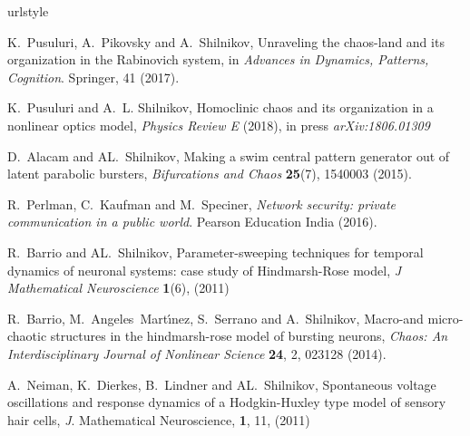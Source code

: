 \documentclass{ws-book9x6}
\begin{document}
%

%

% 

\begin{thebibliography}{6}
\newcommand{\enquote}[1]{#1}
\providecommand{\natexlab}[1]{#1}
\providecommand{\url}[1]{\texttt{#1}}
\providecommand{\urlprefix}{URL }
\providecommand{\eprint}{eprint }
\expandafter\ifx\csname urlstyle\endcsname\relax
  \providecommand{\doi}[1]{doi:\discretionary{}{}{}#1}\else
  \providecommand{\doi}{doi:\discretionary{}{}{}\begingroup
  \urlstyle{rm}\Url}\fi


K.~Pusuluri, A.~Pikovsky and A.~Shilnikov, \enquote{Unraveling the chaos-land
  and its organization in the Rabinovich system,} in \emph{Advances in
  Dynamics, Patterns, Cognition}.
\newblock Springer, 41 (2017).

K.~Pusuluri and A.~L. Shilnikov, \enquote{Homoclinic chaos and its organization
  in a nonlinear optics model,}  \emph{Physics Review E} (2018), in press  \emph{arXiv:1806.01309}  

D.~Alacam and AL.~Shilnikov,  \enquote{Making a swim central pattern generator out of latent parabolic bursters,} \emph{Bifurcations and Chaos} \textbf{25}(7), 1540003 (2015).

R.~Perlman, C.~Kaufman and M.~Speciner, \emph{Network security: private
  communication in a public world}.
\newblock Pearson Education India (2016).

R.~Barrio and AL.~Shilnikov, \enquote{Parameter-sweeping techniques for temporal dynamics of neuronal systems: case study of Hindmarsh-Rose model,} \emph{J Mathematical Neuroscience} \textbf{1}(6), (2011)

R.~Barrio, M.~Angeles~Mart{\'\i}nez, S.~Serrano and A.~Shilnikov,
  \enquote{Macro-and micro-chaotic structures in the hindmarsh-rose model of
  bursting neurons,} \emph{Chaos: An Interdisciplinary Journal of Nonlinear
  Science} \textbf{24}, 2, 023128 (2014).

A.~Neiman, K.~Dierkes, B.~Lindner and AL.~Shilnikov,  \enquote{ Spontaneous voltage oscillations and response dynamics of a Hodgkin-Huxley type model of sensory hair cells,} {\emph J. Mathematical Neuroscience,} \textbf{1}, 11, (2011)


\end{thebibliography}
\end{document}
